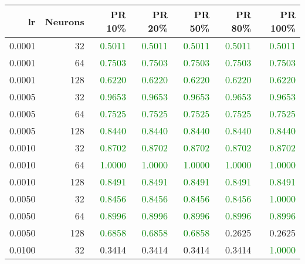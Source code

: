 \begin{tabular}{rrrrrrr}
\toprule
lr & Neurons & PR 10\% & PR 20\% & PR 50\% & PR 80\% & PR 100\% \\
\midrule
0.0001 & 32 & \textcolor{green} {0.5011} & \textcolor{green} {0.5011} & \textcolor{green} {0.5011} & \textcolor{green} {0.5011} & \textcolor{green} {0.5011} \\
0.0001 & 64 & \textcolor{green} {0.7503} & \textcolor{green} {0.7503} & \textcolor{green} {0.7503} & \textcolor{green} {0.7503} & \textcolor{green} {0.7503} \\
0.0001 & 128 & \textcolor{green} {0.6220} & \textcolor{green} {0.6220} & \textcolor{green} {0.6220} & \textcolor{green} {0.6220} & \textcolor{green} {0.6220} \\
0.0005 & 32 & \textcolor{green} {0.9653} & \textcolor{green} {0.9653} & \textcolor{green} {0.9653} & \textcolor{green} {0.9653} & \textcolor{green} {0.9653} \\
0.0005 & 64 & \textcolor{green} {0.7525} & \textcolor{green} {0.7525} & \textcolor{green} {0.7525} & \textcolor{green} {0.7525} & \textcolor{green} {0.7525} \\
0.0005 & 128 & \textcolor{green} {0.8440} & \textcolor{green} {0.8440} & \textcolor{green} {0.8440} & \textcolor{green} {0.8440} & \textcolor{green} {0.8440} \\
0.0010 & 32 & \textcolor{green} {0.8702} & \textcolor{green} {0.8702} & \textcolor{green} {0.8702} & \textcolor{green} {0.8702} & \textcolor{green} {0.8702} \\
0.0010 & 64 & \textcolor{green} {1.0000} & \textcolor{green} {1.0000} & \textcolor{green} {1.0000} & \textcolor{green} {1.0000} & \textcolor{green} {1.0000} \\
0.0010 & 128 & \textcolor{green} {0.8491} & \textcolor{green} {0.8491} & \textcolor{green} {0.8491} & \textcolor{green} {0.8491} & \textcolor{green} {0.8491} \\
0.0050 & 32 & \textcolor{green} {0.8456} & \textcolor{green} {0.8456} & \textcolor{green} {0.8456} & \textcolor{green} {0.8456} & \textcolor{green} {1.0000} \\
0.0050 & 64 & \textcolor{green} {0.8996} & \textcolor{green} {0.8996} & \textcolor{green} {0.8996} & \textcolor{green} {0.8996} & \textcolor{green} {0.8996} \\
0.0050 & 128 & \textcolor{green} {0.6858} & \textcolor{green} {0.6858} & \textcolor{green} {0.6858} & \textcolor{blu} {0.2625} & \textcolor{blu} {0.2625} \\
0.0100 & 32 & \textcolor{blu} {0.3414} & \textcolor{blu} {0.3414} & \textcolor{blu} {0.3414} & \textcolor{blu} {0.3414} & \textcolor{green} {1.0000} \\

\end{tabular}

